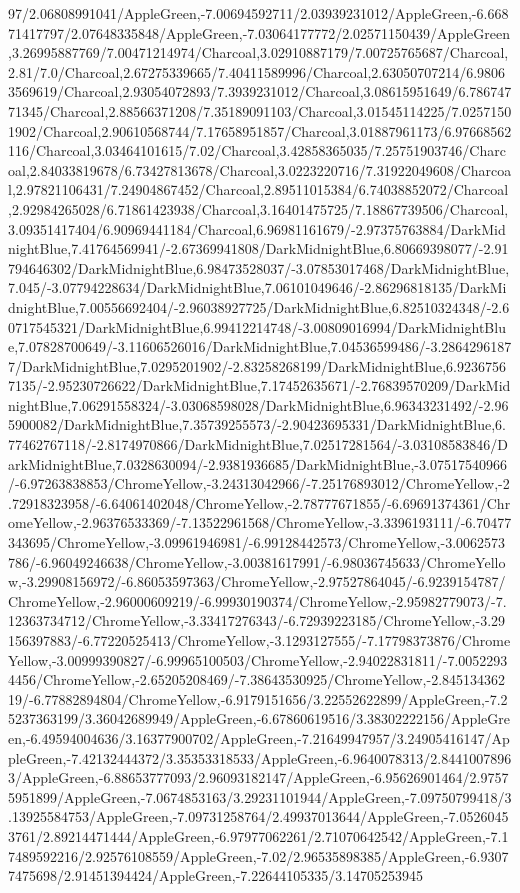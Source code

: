 {\begin{tikzternal}
97/2.06808991041/AppleGreen,-7.00694592711/2.03939231012/AppleGreen,-6.66871417797/2.07648335848/AppleGreen,-7.03064177772/2.02571150439/AppleGreen,3.26995887769/7.00471214974/Charcoal,3.02910887179/7.00725765687/Charcoal,2.81/7.0/Charcoal,2.67275339665/7.40411589996/Charcoal,2.63050707214/6.98063569619/Charcoal,2.93054072893/7.3939231012/Charcoal,3.08615951649/6.78674771345/Charcoal,2.88566371208/7.35189091103/Charcoal,3.01545114225/7.02571501902/Charcoal,2.90610568744/7.17658951857/Charcoal,3.01887961173/6.97668562116/Charcoal,3.03464101615/7.02/Charcoal,3.42858365035/7.25751903746/Charcoal,2.84033819678/6.73427813678/Charcoal,3.0223220716/7.31922049608/Charcoal,2.97821106431/7.24904867452/Charcoal,2.89511015384/6.74038852072/Charcoal,2.92984265028/6.71861423938/Charcoal,3.16401475725/7.18867739506/Charcoal,3.09351417404/6.90969441184/Charcoal,6.96981161679/-2.97375763884/DarkMidnightBlue,7.41764569941/-2.67369941808/DarkMidnightBlue,6.80669398077/-2.91794646302/DarkMidnightBlue,6.98473528037/-3.07853017468/DarkMidnightBlue,7.045/-3.07794228634/DarkMidnightBlue,7.06101049646/-2.86296818135/DarkMidnightBlue,7.00556692404/-2.96038927725/DarkMidnightBlue,6.82510324348/-2.60717545321/DarkMidnightBlue,6.99412214748/-3.00809016994/DarkMidnightBlue,7.07828700649/-3.11606526016/DarkMidnightBlue,7.04536599486/-3.28642961877/DarkMidnightBlue,7.0295201902/-2.83258268199/DarkMidnightBlue,6.92367567135/-2.95230726622/DarkMidnightBlue,7.17452635671/-2.76839570209/DarkMidnightBlue,7.06291558324/-3.03068598028/DarkMidnightBlue,6.96343231492/-2.965900082/DarkMidnightBlue,7.35739255573/-2.90423695331/DarkMidnightBlue,6.77462767118/-2.8174970866/DarkMidnightBlue,7.02517281564/-3.03108583846/DarkMidnightBlue,7.0328630094/-2.9381936685/DarkMidnightBlue,-3.07517540966/-6.97263838853/ChromeYellow,-3.24313042966/-7.25176893012/ChromeYellow,-2.72918323958/-6.64061402048/ChromeYellow,-2.78777671855/-6.69691374361/ChromeYellow,-2.96376533369/-7.13522961568/ChromeYellow,-3.3396193111/-6.70477343695/ChromeYellow,-3.09961946981/-6.99128442573/ChromeYellow,-3.0062573786/-6.96049246638/ChromeYellow,-3.00381617991/-6.98036745633/ChromeYellow,-3.29908156972/-6.86053597363/ChromeYellow,-2.97527864045/-6.9239154787/ChromeYellow,-2.96000609219/-6.99930190374/ChromeYellow,-2.95982779073/-7.12363734712/ChromeYellow,-3.33417276343/-6.72939223185/ChromeYellow,-3.29156397883/-6.77220525413/ChromeYellow,-3.1293127555/-7.17798373876/ChromeYellow,-3.00999390827/-6.99965100503/ChromeYellow,-2.94022831811/-7.00522934456/ChromeYellow,-2.65205208469/-7.38643530925/ChromeYellow,-2.84513436219/-6.77882894804/ChromeYellow,-6.9179151656/3.22552622899/AppleGreen,-7.25237363199/3.36042689949/AppleGreen,-6.67860619516/3.38302222156/AppleGreen,-6.49594004636/3.16377900702/AppleGreen,-7.21649947957/3.24905416147/AppleGreen,-7.42132444372/3.35353318533/AppleGreen,-6.9640078313/2.84410078963/AppleGreen,-6.88653777093/2.96093182147/AppleGreen,-6.95626901464/2.97575951899/AppleGreen,-7.0674853163/3.29231101944/AppleGreen,-7.09750799418/3.13925584753/AppleGreen,-7.09731258764/2.49937013644/AppleGreen,-7.05260453761/2.89214471444/AppleGreen,-6.97977062261/2.71070642542/AppleGreen,-7.17489592216/2.92576108559/AppleGreen,-7.02/2.96535898385/AppleGreen,-6.93077475698/2.91451394424/AppleGreen,-7.22644105335/3.14705253945
\end{tikzternal}}
